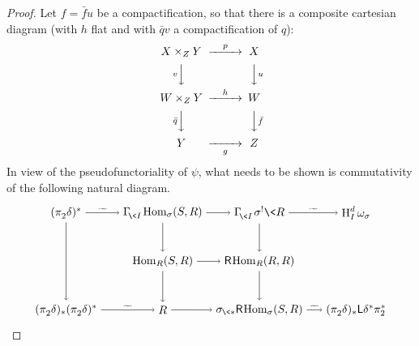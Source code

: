 \documentclass{compositio}
\theoremstyle{plain}
\theoremstyle{definition}
\theoremstyle{remark}
\numberwithin{equation}{thm}
\begin{document}
\begin{proof} 
Let $f=\bar f u$ be a compactification, so that there is a composite cartesian diagram (with $h$ flat 
and with $\bar q v$ a compactification of $q$):
\[
\CD
X\times_ZY @>p>> X\\
@VvVV @VVuV\\
W\times_ZY @>h>> W\\
@V\bar q VV @VV\bar f V\\
Y @>>g> Z
\endCD
\]
In view of the pseudofunctoriality of $\psi$, what needs to be shown is commutativity of the following natural diagram.
\[

 \begin{tikzpicture}[xscale=3, yscale=1.5]

   \node(10) at (0,-1){$(\pi^{}_2\delta)^*$} ; 
   \node(11) at (1,-1){$\Gamma^{}_{\!{\mkern-1mu}\<I}{\mkern-1mu}\operatorname{Hom}_\sigma(S,R)$};   
   \node(12) at (2,-1){$\Gamma^{}_{\!{\mkern-1mu}\<I}{\mkern1mu}{\mkern1mu}\sigma^!\<R$};
   \node(13) at (3,-1){$\textup{H}^d_I\,\omega_\sigma$};
  
  
   \node(21) at (1,-2){$\operatorname{Hom}_R(S,R)$};
   \node(22) at (2,-2){${\mathsf R}{\mkern-1mu}{\mkern-1mu}\operatorname{Hom}_R(R,R)$};

   \node(30) at (0,-3){$(\pi^{}_2\delta)_*(\pi^{}_2\delta)^*$} ;    
   \node(31) at (1,-3){$R$};
   \node(32) at (2,-3){$\sigma_{{\mkern-1mu}\<*}{\mathsf R}{\mkern-1mu}{\mkern-1mu}\operatorname{Hom}_\sigma(S,R)$};
   \node(33) at (3,-3){$(\pi^{}_2\delta)_*{\mathsf L}\delta^*\pi_2^*$};

 
	   \draw[->] (10)--(11) node[above=1pt, midway, scale=.75]{${\vbox to 0pt{\vss\hbox{$\widetilde{\phantom{nn}}$}\vskip-7pt}}$};
	   \draw[->] (11)--(12) ;
	   \draw[->] (12)--(13) node[above=1pt, midway, scale=.75]{${\vbox to 0pt{\vss\hbox{$\widetilde{\phantom{nn}}$}\vskip-7pt}}$};  
                  
	   \draw[->] (21)--(22) ; 
  
           \draw[->] (30)--(31) node[above=1pt, midway, scale=.75]{${\vbox to 0pt{\vss\hbox{$\widetilde{\phantom{nn}}$}\vskip-7pt}}$};
	   \draw[->] (31)--(32) ;
	   \draw[->] (32)--(33) node[above=1pt, midway, scale=.75]{${\vbox to 0pt{\vss\hbox{$\widetilde{\phantom{nn}}$}\vskip-7pt}}$}; 
	   
	 
 
 	   \draw[->] (10)--(30) ;

	   \draw[->] (11)--(21) ;
	   \draw[->] (21)--(31) ;
	   	   
	   \draw[->] (12)--(22) ;
	   \draw[->] (22)--(32) ;
	 	    

\end{tikzpicture}\]
\end{proof}
\end{document}
